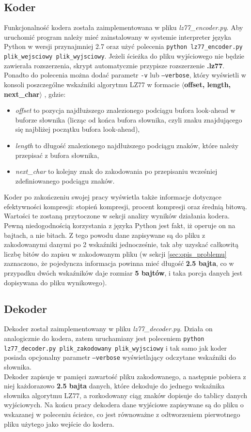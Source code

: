 \documentclass{article}
\def\code#1{\texttt{#1}}
\begin{document}
\subsection{Koder}
Funkcjonalność kodera została zaimplementowana w pliku \textit{lz77\_encoder.py}. Aby uruchomić program należy mieć zainstalowany w systemie interpreter języka Python w wersji przynajmniej 2.7 oraz użyć polecenia \code{python lz77\_encoder.py plik\_wejsciowy plik\_wyjsciowy}. Jeżeli ścieżka do pliku wyjściowego nie będzie zawierała rozszerzenia, skrypt automatycznie przypisze rozszerzenie \textbf{.lz77}. Ponadto do polecenia można dodać parametr \code{-v} lub \code{--verbose}, który wyświetli w konsoli poszczególne wskaźniki algorytmu LZ77 w formacie \textbf{$\langle$offset, length, next\_char$\rangle$} , gdzie:
\begin{itemize}
    \item \textit{offset} to pozycja najdłuższego znalezionego podciągu bufora look-ahead w buforze słownika (licząc od końca bufora słownika, czyli znaku znajdującego się najbliżej początku bufora look-ahead),
    \item \textit{length} to długość znalezionego najdłuższego podciągu znaków, które należy przepisać z bufora słownika,
    \item \textit{next\_char} to kolejny znak do zakodowania po przepisaniu wcześniej zdefiniowanego podciągu znaków.
\end{itemize}
Koder po zakończeniu swojej pracy wyświetla także informacje dotyczące efektywności kompresji: stopień kompresji, procent kompresji oraz średnią bitową. Wartości te zostaną przytoczone w sekcji analizy wyników działania kodera.
\\ Pewną niedogodnością korzystania z języka Python jest fakt, iż operuje on na bajtach, a nie bitach. Z tego powodu dane zapisywane są do pliku z zakodowanymi danymi po 2 wskaźniki jednocześnie, tak aby uzyskać całkowitą liczbę bitów do zapisu w zakodowanym pliku (w sekcji \ref{sec:opis_problemu} zaznaczono, że pojedyncza informacja powinna mieć długość \textbf{2.5 bajta}, co w przypadku dwóch wskaźników daje rozmiar \textbf{5 bajtów}, i taka porcja danych jest dopisywana do pliku wynikowego). 

\subsection{Dekoder}
Dekoder został zaimplementowany w pliku \textit{lz77\_decoder.py}. Działa on analogicznie do kodera, zatem uruchamiany jest poleceniem \code{python lz77\_decoder.py plik\_zakodowany plik\_wyjsciowy} i tak samo jak koder posiada opcjonalny parametr \code{--verbose} wyświetlający odczytane wskaźniki do słownika.
\\Dekoder zapisuje w pamięci zawartość pliku zakodowanego, a następnie pobiera z niej każdorazowo \textbf{2.5 bajta} danych, które dekoduje do jednego wskaźnika słownika algorytmu LZ77, a rozkodowany ciąg znaków dopisuje do tablicy danych wyjściowych. Na końcu pracy dekodera dane wyjściowe zapisywane są do pliku o wskazanej w poleceniu ścieżce, co jest równoważne z odtworzeniem pierwotnego pliku użytego jako wejście do kodera.
\end{document}

